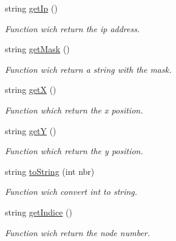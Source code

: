 \begin{CompactItemize}
string \hyperlink{class_equipement_1b589d4b1c6580ceeb3f8ce9c6e8d579}{getIp} ()
\begin{CompactList}\small\item\em Function wich return the ip address. \item\end{CompactList}\item 
string \hyperlink{class_equipement_02fa3326bab78a49535be1cbd2bd8078}{getMask} ()
\begin{CompactList}\small\item\em Function wich return a string with the mask. \item\end{CompactList}\item 
string \hyperlink{class_equipement_0899c6ce57408519616fc3c237ca0c83}{getX} ()
\begin{CompactList}\small\item\em Function which return the x position. \item\end{CompactList}\item 
string \hyperlink{class_equipement_daa17552b40be78e18b1cb03087a2a27}{getY} ()
\begin{CompactList}\small\item\em Function which return the y position. \item\end{CompactList}\item 
string \hyperlink{class_equipement_33973a0f392135d7c50b8ce59fa60941}{toString} (int nbr)
\begin{CompactList}\small\item\em Function wich convert int to string. \item\end{CompactList}\item 
string \hyperlink{class_equipement_59cfa2b20bf9b66d150f353a0316eeae}{getIndice} ()
\begin{CompactList}\small\item\em Function wich return the node number. \item\end{CompactList}\end{CompactItemize}

